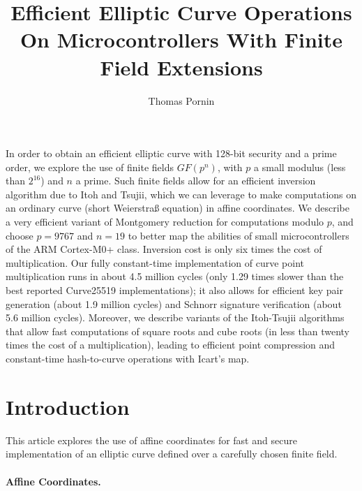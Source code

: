 \documentclass{llncs}
\makeatletter
\renewenvironment{abstract}{%
      \list{}{\advance\topsep by0.35cm\relax\small
      \leftmargin=1cm
      \labelwidth=\z@
      \listparindent=\z@
      \itemindent\listparindent
      \rightmargin\leftmargin}\item[\hskip\labelsep
                                    \textsf{\textbf{\abstractname}}]}
    {\endlist}
\newcommand{\GF}{GF}
\makeatother
\begin{document}
\title{\textsf{Efficient Elliptic Curve Operations On Microcontrollers
With Finite Field Extensions}}

\author{Thomas Pornin}

\maketitle
\noindent{}

\begin{abstract}
In order to obtain an efficient elliptic curve with 128-bit security and
a prime order, we explore the use of finite fields $\GF(p^n)$, with $p$
a small modulus (less than $2^{16}$) and $n$ a prime. Such finite fields
allow for an efficient inversion algorithm due to Itoh and Tsujii, which
we can leverage to make computations on an ordinary curve (short
Weierstraß equation) in affine coordinates. We describe a very efficient
variant of Montgomery reduction for computations modulo $p$, and choose
$p = 9767$ and $n = 19$ to better map the abilities of small
microcontrollers of the ARM Cortex-M0+ class. Inversion cost is only six
times the cost of multiplication. Our fully constant-time implementation
of curve point multiplication runs in about 4.5 million cycles (only
1.29 times slower than the best reported Curve25519 implementations); it
also allows for efficient key pair generation (about 1.9 million cycles)
and Schnorr signature verification (about 5.6 million cycles). Moreover,
we describe variants of the Itoh-Tsujii algorithms that allow fast
computations of square roots and cube roots (in less than twenty times
the cost of a multiplication), leading to efficient point compression
and constant-time hash-to-curve operations with Icart's map.
\end{abstract}

\section{Introduction}\label{sec:intro}

This article explores the use of affine coordinates for fast and secure
implementation of an elliptic curve defined over a carefully chosen
finite field.

\paragraph{Affine Coordinates.}
\end{document}
